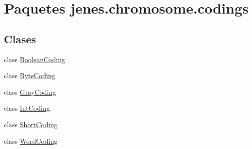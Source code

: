 \hypertarget{namespacejenes_1_1chromosome_1_1codings}{\section{Paquetes jenes.\-chromosome.\-codings}
\label{namespacejenes_1_1chromosome_1_1codings}
}
\subsection*{Clases}
\begin{DoxyCompactItemize}
\item 
class \hyperlink{classjenes_1_1chromosome_1_1codings_1_1_boolean_coding}{Boolean\-Coding}
\item 
class \hyperlink{classjenes_1_1chromosome_1_1codings_1_1_byte_coding}{Byte\-Coding}
\item 
class \hyperlink{classjenes_1_1chromosome_1_1codings_1_1_gray_coding}{Gray\-Coding}
\item 
class \hyperlink{classjenes_1_1chromosome_1_1codings_1_1_int_coding}{Int\-Coding}
\item 
class \hyperlink{classjenes_1_1chromosome_1_1codings_1_1_short_coding}{Short\-Coding}
\item 
class \hyperlink{classjenes_1_1chromosome_1_1codings_1_1_word_coding}{Word\-Coding}
\end{DoxyCompactItemize}
